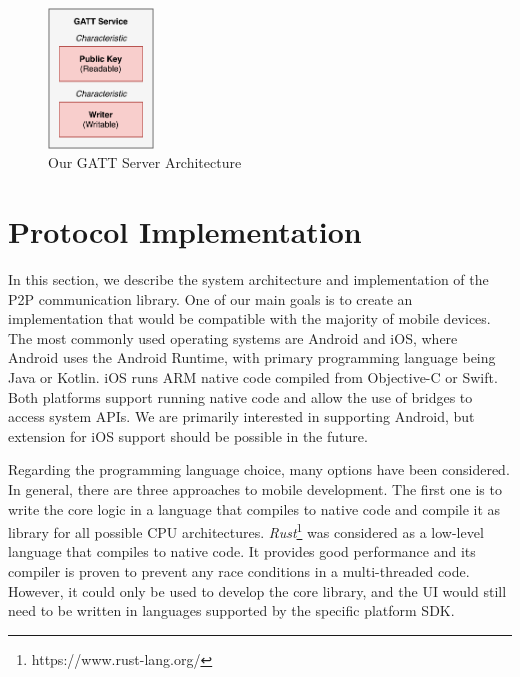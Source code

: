 \begin{figure}
    \centering
    \includegraphics[width=0.25\textwidth]{diagrams/ipv8-gatt}
    \caption{Our GATT Server Architecture}
    \label{gatt_server}
\end{figure}




\chapter{Protocol Implementation}

In this section, we describe the system architecture and implementation of the P2P communication library. One of our main goals is to create an implementation that would be compatible with the majority of mobile devices. The most commonly used operating systems are Android and iOS, where Android uses the Android Runtime, with primary programming language being Java or Kotlin. iOS runs ARM native code compiled from Objective-C or Swift. Both platforms support running native code and allow the use of bridges to access system APIs. We are primarily interested in supporting Android, but extension for iOS support should be possible in the future.

Regarding the programming language choice, many options have been considered. In general, there are three approaches to mobile development. The first one is to write the core logic in a language that compiles to native code and compile it as library for all possible CPU architectures. \textit{Rust}\footnote{https://www.rust-lang.org/} was considered as a low-level language that compiles to native code. It provides good performance and its compiler is proven to prevent any race conditions in a multi-threaded code. However, it could only be used to develop the core library, and the UI would still need to be written in languages supported by the specific platform SDK.

